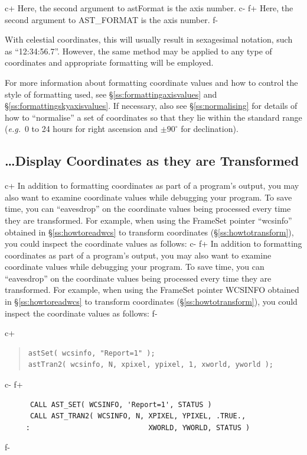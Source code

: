 \documentclass[twoside,11pt]{article}
\newcommand{\secref}[1]{\S\ref{#1}}
\newcommand{\secref}[1]{\ref{#1}}
\begin{document}
c+
Here, the second argument to astFormat is the axis number.
c-
f+
Here, the second argument to AST\_FORMAT is the axis number.
f-

With celestial coordinates, this will usually result in sexagesimal
notation, such as ``12:34:56.7''. However, the same method may be
applied to any type of coordinates and appropriate formatting will be
employed.

For more information about formatting coordinate values and how to
control the style of formatting used, see
\secref{ss:formattingaxisvalues} and
\secref{ss:formattingskyaxisvalues}. If necessary, also see
\secref{ss:normalising} for details of how to ``normalise'' a set of
coordinates so that they lie within the standard range ({\em{e.g.}}\ 0
to 24 hours for right ascension and $\pm 90^\circ$ for
declination).

\subsection{\ldots Display Coordinates as they are Transformed}

c+
In addition to formatting coordinates as part of a program's output,
you may also want to examine coordinate values while debugging your
program. To save time, you can ``eavesdrop'' on the coordinate values
being processed every time they are transformed. For example, when
using the FrameSet pointer ``wcsinfo'' obtained in
\secref{ss:howtoreadwcs} to transform coordinates
(\secref{ss:howtotransform}), you could inspect the coordinate values
as follows:
c-
f+
In addition to formatting coordinates as part of a program's output,
you may also want to examine coordinate values while debugging your
program. To save time, you can ``eavesdrop'' on the coordinate values
being processed every time they are transformed. For example, when
using the FrameSet pointer WCSINFO obtained in
\secref{ss:howtoreadwcs} to transform coordinates
(\secref{ss:howtotransform}), you could inspect the coordinate values
as follows:
f-

c+
\begin{quote}
\small
\begin{verbatim}
astSet( wcsinfo, "Report=1" );
astTran2( wcsinfo, N, xpixel, ypixel, 1, xworld, yworld );
\end{verbatim}
\normalsize
\end{quote}
c-
f+
\small
\begin{verbatim}
      CALL AST_SET( WCSINFO, 'Report=1', STATUS )
      CALL AST_TRAN2( WCSINFO, N, XPIXEL, YPIXEL, .TRUE.,
     :                            XWORLD, YWORLD, STATUS )
\end{verbatim}
\normalsize
f-
\end{document}
